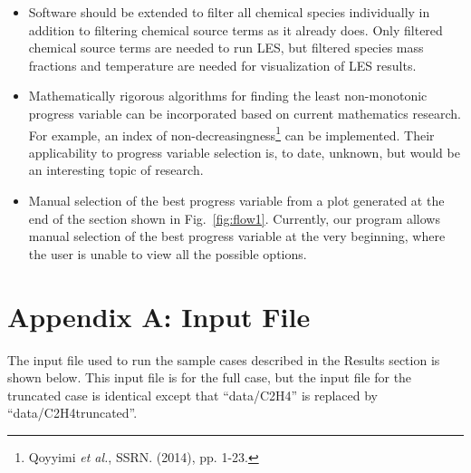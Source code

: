 \documentclass[11pt]{article}
\begin{document}
\begin{itemize}
\item Software should be extended to filter all chemical species individually in addition to filtering chemical source terms as it already does. Only filtered chemical source terms are needed to run LES, but filtered species mass fractions and temperature are needed for visualization of LES results.
\item Mathematically rigorous algorithms for finding the least non-monotonic progress variable can be incorporated based on current mathematics research. For example, an index of non-decreasingness\footnote{Qoyyimi \textit{et al.}, SSRN. (2014), pp. 1-23.} can be implemented. Their applicability to progress variable selection is, to date, unknown, but would be an interesting topic of research.
\item Manual selection of the best progress variable from a plot generated at the end of the section shown in Fig.~\ref{fig:flow1}. Currently, our program allows manual selection of the best progress variable at the very beginning, where the user is unable to view all the possible options.
\end{itemize}


\clearpage
\section*{Appendix A: Input File}

The input file used to run the sample cases described in the Results section is shown below. This input file is for the full case, but the input file for the truncated case is identical except that “data/C2H4” is replaced by “data/C2H4truncated”.

\vspace{12pt}
\end{document}
